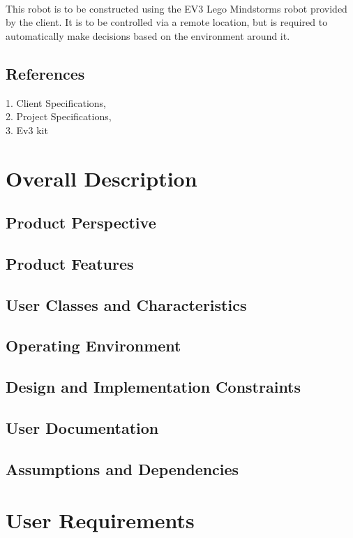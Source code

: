 \documentclass[10pt,a4paper,titlepage]{article}
\begin{document}
	\paragraph{}
This robot is to be constructed using the EV3 Lego Mindstorms robot provided by the client. It is to be controlled via a remote location, but is required to automatically make decisions based on the environment around it.

	\subsection{References}
1. Client Specifications, \\
2. Project Specifications, \\
3. Ev3 kit
	
	\section{Overall Description}
	\subsection{Product Perspective}
	\subsection{Product Features}
	\subsection{User Classes and Characteristics}
	\subsection{Operating Environment}
	\subsection{Design and Implementation Constraints}
	\subsection{User Documentation}
	\subsection{Assumptions and Dependencies}
	
	\section{User Requirements}
\end{document}
